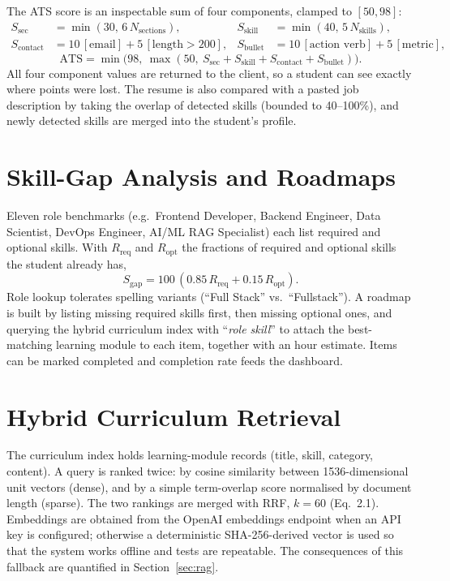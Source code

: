 \documentclass[openany]{tietreport}
\begin{document}
The ATS score is an inspectable sum of four components, clamped to $[50,98]$:
\begin{align}
S_{\mathrm{sec}} &= \min(30,\, 6\,N_{\mathrm{sections}}), &
S_{\mathrm{skill}} &= \min(40,\, 5\,N_{\mathrm{skills}}),\\
S_{\mathrm{contact}} &= 10\,[\text{email}] + 5\,[\text{length}>200], &
S_{\mathrm{bullet}} &= 10\,[\text{action verb}] + 5\,[\text{metric}],
\end{align}
\begin{equation}
  \mathrm{ATS} = \min\bigl(98,\ \max(50,\ S_{\mathrm{sec}}+S_{\mathrm{skill}}+S_{\mathrm{contact}}+S_{\mathrm{bullet}})\bigr).
\end{equation}
All four component values are returned to the client, so a student can see exactly where points were lost. The resume is also compared with a pasted job description by taking the overlap of detected skills (bounded to 40--100\%), and newly detected skills are merged into the student's profile.

\section{Skill-Gap Analysis and Roadmaps}
Eleven role benchmarks (e.g.\ Frontend Developer, Backend Engineer, Data Scientist, DevOps Engineer, AI/ML RAG Specialist) each list required and optional skills. With $R_{\mathrm{req}}$ and $R_{\mathrm{opt}}$ the fractions of required and optional skills the student already has,
\begin{equation}
  S_{\mathrm{gap}} = 100\,(0.85\,R_{\mathrm{req}} + 0.15\,R_{\mathrm{opt}}).
\end{equation}
Role lookup tolerates spelling variants (``Full Stack'' vs.\ ``Fullstack''). A roadmap is built by listing missing required skills first, then missing optional ones, and querying the hybrid curriculum index with ``\emph{role skill}'' to attach the best-matching learning module to each item, together with an hour estimate. Items can be marked completed and completion rate feeds the dashboard.

\section{Hybrid Curriculum Retrieval}
The curriculum index holds learning-module records (title, skill, category, content). A query is ranked twice: by cosine similarity between 1536-dimensional unit vectors (dense), and by a simple term-overlap score normalised by document length (sparse). The two rankings are merged with RRF, $k=60$ (Eq.~2.1). Embeddings are obtained from the OpenAI embeddings endpoint when an API key is configured; otherwise a deterministic SHA-256-derived vector is used so that the system works offline and tests are repeatable. The consequences of this fallback are quantified in Section~\ref{sec:rag}.
\end{document}

